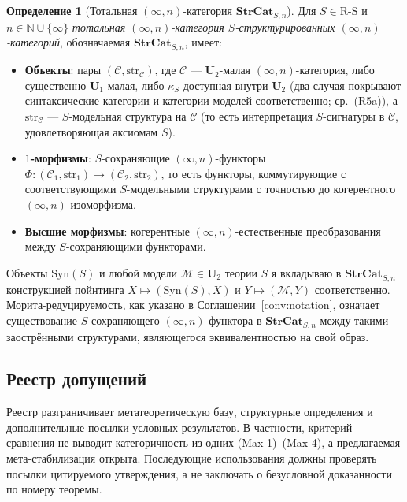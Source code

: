 \documentclass[11pt]{article}
\theoremstyle{plain}
\theoremstyle{definition}
\newtheorem{definition}[theorem]{Определение}
\newcommand{\RS}{\mathrm{R\text{-}S}}
\newcommand{\cM}{\mathcal{M}}
\newcommand{\cC}{\mathcal{C}}
\newcommand{\Syn}{\mathrm{Syn}}
\begin{document}
\begin{definition}[Тотальная $(\infty, n)$-категория $\mathbf{StrCat}_{S, n}$]\label{def:strcat}
Для $S \in \RS$ и $n \in \mathbb{N} \cup \{\infty\}$ \emph{тотальная $(\infty, n)$-категория $S$-структурированных $(\infty, n)$-категорий}, обозначаемая $\mathbf{StrCat}_{S, n}$, имеет:
\begin{itemize}
\item \textbf{Объекты}: пары $(\cC, \mathrm{str}_\cC)$, где $\cC$ — $\mathbf{U}_2$-малая $(\infty, n)$-категория, либо существенно $\mathbf{U}_1$-малая, либо $\kappa_S$-доступная внутри $\mathbf{U}_2$ (два случая покрывают синтаксические категории и категории моделей соответственно; ср.\ (R5a)), а $\mathrm{str}_\cC$ — $S$-модельная структура на $\cC$ (то есть интерпретация $S$-сигнатуры в $\cC$, удовлетворяющая аксиомам $S$).
\item \textbf{$1$-морфизмы}: $S$-сохраняющие $(\infty, n)$-функторы $\Phi : (\cC_1, \mathrm{str}_1) \to (\cC_2, \mathrm{str}_2)$, то есть функторы, коммутирующие с соответствующими $S$-модельными структурами с точностью до когерентного $(\infty, n)$-изоморфизма.
\item \textbf{Высшие морфизмы}: когерентные $(\infty, n)$-естественные преобразования между $S$-сохраняющими функторами.
\end{itemize}
Объекты $\Syn(S)$ и любой модели $\cM \in \mathbf{U}_2$ теории $S$ я вкладываю в $\mathbf{StrCat}_{S, n}$ конструкцией пойнтинга $X \mapsto (\Syn(S), X)$ и $Y \mapsto (\cM, Y)$ соответственно. Морита-редуцируемость, как указано в Соглашении~\ref{conv:notation}, означает существование $S$-сохраняющего $(\infty, n)$-функтора в $\mathbf{StrCat}_{S, n}$ между такими заострёнными структурами, являющегося эквивалентностью на свой образ.
\end{definition}

\subsection{Реестр допущений}\label{sec:assumption-register}

Реестр разграничивает метатеоретическую базу, структурные определения и дополнительные посылки условных результатов. В частности, критерий сравнения не выводит категоричность из одних (Max-1)--(Max-4), а предлагаемая мета-стабилизация открыта. Последующие использования должны проверять посылки цитируемого утверждения, а не заключать о безусловной доказанности по номеру теоремы.
\end{document}
